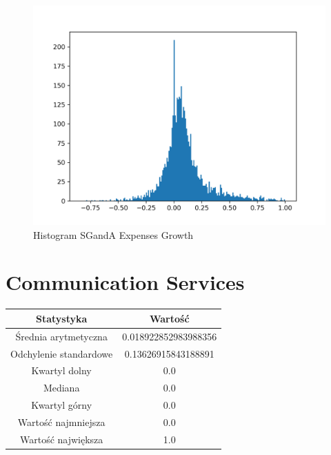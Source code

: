 \documentclass{article}
\begin{document}
\begin{figure}[h!]
    \includegraphics[width=\linewidth]{variables/SG_A Expenses Growth.png}
    \caption{Histogram SGandA Expenses Growth }
\end{figure}\section{ Communication Services }

\begin{center}
    \begin{tabular}{|c | c|} 
    \hline
    Statystyka & Wartość \\
    \hline\hline
    Średnia arytmetyczna & 0.018922852983988356 \\ 
    \hline
    Odchylenie standardowe & 0.13626915843188891 \\
    \hline
    Kwartyl dolny & 0.0 \\
    \hline
    Mediana & 0.0 \\
    \hline
    Kwartyl górny & 0.0 \\
    \hline
    Wartość najmniejsza & 0.0 \\
    \hline
    Wartość największa & 1.0 \\
    \hline
   \end{tabular}
\end{center}
\end{document}
